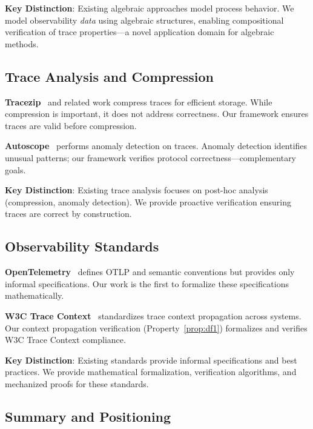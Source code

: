 \textbf{Key Distinction}: Existing algebraic approaches model process behavior. We model observability \textit{data} using algebraic structures, enabling compositional verification of trace properties—a novel application domain for algebraic methods.

\subsection{Trace Analysis and Compression}
\label{sec:related-analysis}

\textbf{Tracezip}~\cite{omote2002tracezip} and related work compress traces for efficient storage. While compression is important, it does not address correctness. Our framework ensures traces are valid before compression.

\textbf{Autoscope}~\cite{kasick2010autoscope} performs anomaly detection on traces. Anomaly detection identifies unusual patterns; our framework verifies protocol correctness—complementary goals.

\textbf{Key Distinction}: Existing trace analysis focuses on post-hoc analysis (compression, anomaly detection). We provide proactive verification ensuring traces are correct by construction.

\subsection{Observability Standards}
\label{sec:related-standards}

\textbf{OpenTelemetry}~\cite{opentelemetry2023} defines OTLP and semantic conventions but provides only informal specifications. Our work is the first to formalize these specifications mathematically.

\textbf{W3C Trace Context}~\cite{w3c2021tracectx} standardizes trace context propagation across systems. Our context propagation verification (Property~\ref{prop:df1}) formalizes and verifies W3C Trace Context compliance.

\textbf{Key Distinction}: Existing standards provide informal specifications and best practices. We provide mathematical formalization, verification algorithms, and mechanized proofs for these standards.

\subsection{Summary and Positioning}
\label{sec:related-summary}

